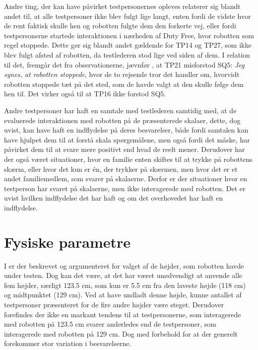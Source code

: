Andre ting, der kan have påvirket testpersonernes opleves relaterer sig blandt andet til, at alle testpersoner ikke blev fulgt lige langt, enten fordi de vidste hvor de rent faktisk skulle hen og robotten fulgte dem den forkerte vej, eller fordi testpersonerne startede interaktionen i nærheden af Duty Free, hvor robotten som regel stoppede. Dette gør sig blandt andet gældende for TP14 og TP27, som ikke blev fulgt afsted af robotten, da testlederen stod lige ved siden af dem. I relation til det, fremgår det fra observationerne, jævnfør , at TP21 misforstod SQ5: \textit{Jeg synes, at robotten stoppede}, hvor de to rejsende tror det handler om, hvorvidt robotten stoppede tæt på det sted, som de havde valgt at den skulle følge dem hen til. Det virker også til at TP16 ikke forstod SQ5. 

Andre testpersoner har haft en samtale med testlederen samtidig med, at de evaluerede interaktionen med robotten på de præsenterede skalaer, dette, dog uvist, kan have haft en indflydelse på deres besvarelser, både fordi samtalen kan have hjulpet dem til at forstå skala spørgsmålene, men også fordi det måske, har påvirket dem til at svare mere positivt end hvad de reelt mener. Derudover har der også været situationer, hvor en familie enten skiftes til at trykke på robottens skærm, eller hvor det kun er én, der trykker på skærmen, men hvor det er et andet familiemedlem, som svarer på skalaerne. Derfor er der situationer hvor en testperson har svaret på skalaerne, men ikke interagerede med robotten. Det er uvist hvilken indflydelse det har haft og om det overhovedet har haft en indflydelse.  


\section{Fysiske parametre}
\label{DiskussionFysiskeParametre}
%
I  er der beskrevet og argumenteret for valget af de højder, som robotten havde under testen. Dog kan det være, at det har været unødvendigt at anvende alle fem højder, særligt 123.5 cm, som kun er 5.5 cm fra den laveste højde (118 cm) og midtpunktet (129 cm). Ved at have undladt denne højde, kunne antallet af testpersoner præsenteret for de fire andre højder være steget. Derudover forefindes der ikke en markant tendens til at testpersonerne, som interagerede med robotten på 123.5 cm svarer anderledes end de testpersoner, som interagerede med robotten på 129 cm. Dog med forbehold for at der generelt forekommer stor variation i besvarelserne. 

